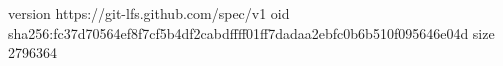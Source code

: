 version https://git-lfs.github.com/spec/v1
oid sha256:fc37d70564ef8f7cf5b4df2cabdffff01ff7dadaa2ebfc0b6b510f095646e04d
size 2796364
